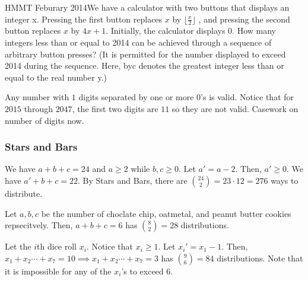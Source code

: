 \documentclass[11pt]{article}
\begin{document}
 {HMMT Feburary 2014}{We have a calculator with two buttons that displays an integer x. Pressing the first button replaces
$x$ by $\lfloor \frac{x}{2} \rfloor$ , and pressing the second button replaces $x$ by $4x + 1$. Initially, the calculator displays 0.
How many integers less than or equal to 2014 can be achieved through a sequence of arbitrary button
presses? (It is permitted for the number displayed to exceed 2014 during the sequence. Here, byc
denotes the greatest integer less than or equal to the real number y.)}

\begin{sol}
Any number with $1$ digits separated by one or more $0$'s  is valid. Notice that for $2015$ through $2047$, the first two digits are $11$ so they are not valid. Casework on number of digits now.
\end{sol}

\subsubsection{Stars and Bars}


\begin{sol}
We have $a+b+c=24$ and $a\ge 2$ while $b,c\ge 0$. Let $a'=a-2$. Then, $a'\ge 0$. We have $a'+b+c=22$. By Stars and Bars, there are $\binom{24}{2}=23\cdot 12=\boxed{276}$ ways to distribute.
\end{sol}


\begin{sol} 
Let $a,b,c$ be the number of choclate chip, oatmetal, and peanut butter cookies repsecitvely. Then, $a+b+c=6$ has $\binom{8}{2}=\boxed{28}$ distributions.
\end{sol}


\begin{sol} 
Let the $i$th dice roll $x_{i}$. Notice that $x_{i}\ge 1$. Let $x_{i}'=x_{1}-1$. Then, $x_{1}+x_{2}\cdots + x_{7}=10\implies x_{1}+x_{2}\cdots + x_{7}=3$ has $\binom{9}{6}=\boxed{84}$ distributions. Note that it is impossible for any of the $x_{i}$'s to exceed $6$.
\end{sol}
\end{document}
